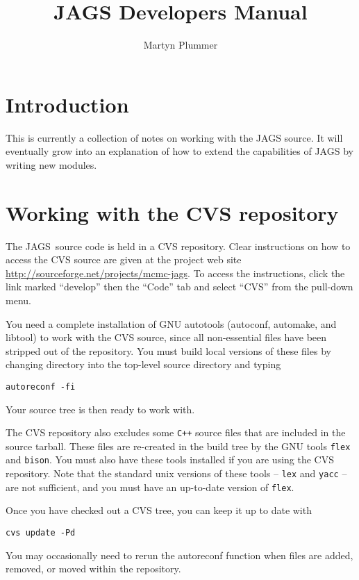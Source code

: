 \documentclass[11pt, a4paper, titlepage]{report}
\newcommand{\JAGS}{\textsf{JAGS}}
\begin{document}
\title{JAGS Developers Manual}
\author{Martyn Plummer}
\maketitle

\tableofcontents

\chapter{Introduction}

This is currently a collection of notes on working with the JAGS
source. It will eventually grow into an explanation of how to extend
the capabilities of JAGS by writing new modules.

\chapter{Working with the CVS repository}

The \JAGS\ source code is held in a CVS repository.  Clear
instructions on how to access the CVS source are given at the project
web site \url{http://sourceforge.net/projects/mcmc-jags}. To access
the instructions, click the link marked ``develop'' then the ``Code''
tab and select ``CVS'' from the pull-down menu.

You need a complete installation of GNU autotools (autoconf, automake,
and libtool) to work with the CVS source, since all non-essential
files have been stripped out of the repository. You must build local
versions of these files by changing directory into the top-level
source directory and typing
\begin{verbatim}
autoreconf -fi
\end{verbatim}
Your source tree is then ready to work with.  

The CVS repository also excludes some \texttt{C++} source files that are
included in the source tarball. These files are re-created in the
build tree by the GNU tools \verb+flex+ and \verb+bison+. You must
also have these tools installed if you are using the CVS
repository. Note that the standard unix versions of these tools --
\verb+lex+ and \verb+yacc+ -- are not sufficient, and you must have an
up-to-date version of \verb+flex+.

Once you have checked out a CVS tree, you can keep it up to date with
\begin{verbatim}
cvs update -Pd
\end{verbatim}
You may occasionally need to rerun the autoreconf function when files
are added, removed, or moved within the repository.
\end{document}
